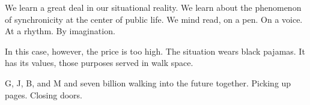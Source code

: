 

We learn a great deal in our situational reality.  We learn about the
phenomenon of synchronicity at the center of public life.  We mind
read, on a pen.  On a voice.  At a rhythm.  By imagination.

In this case, however, the price is too high.  The situation wears
black pajamas.  It has its values, those purposes served in walk
space.

G, J, B, and M and seven billion walking into the future together.
Picking up pages.  Closing doors.

\bye
